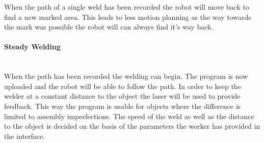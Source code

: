 When the path of a single weld has been recorded the robot will move back to find a new marked area. This leads to less motion planning as the way towards the mark was possible the robot will can always find it's way back.

\paragraph*{Steady Welding}~\\
When the path has been recorded the welding can begin. 
The program is now uploaded and the robot will be able to follow the path.
In order to keep the welder at a constant distance to the object the laser will be used to provide feedback. 
This way the program is usable for objects where the difference is limited to assembly imperfections.
The speed of the weld as well as the distance to the object is decided on the basis of the parameters the worker has provided in the interface.